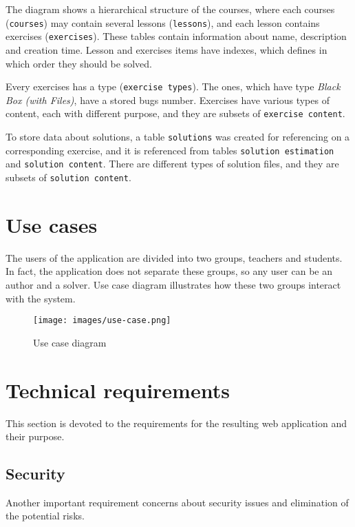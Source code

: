     The diagram shows a hierarchical structure of the courses, where each courses (\texttt{courses}) may contain several lessons (\texttt{lessons}), and each lesson contains exercises (\texttt{exercises}). These tables contain information about name, description and creation time. Lesson and exercises items have indexes, which defines in which order they should be solved.
    
    Every exercises has a type (\texttt{exercise types}). The ones, which have type \textit{Black Box (with Files)}, have a stored bugs number. Exercises have various types of content, each with different purpose, and they are subsets of \texttt{exercise content}.
    
    To store data about solutions, a table \texttt{solutions} was created for referencing on a corresponding exercise, and it is referenced from tables \texttt{solution estimation} and \texttt{solution content}. There are different types of solution files, and they are subsets of \texttt{solution content}.

    
    

    \section{Use cases}
    The users of the application are divided into two groups, teachers and students. In fact, the application does not separate these groups, so any user can be an author and a solver. Use case diagram illustrates how these two groups interact with the system.
    
    \begin{figure}[h]
    \centerline{
        \texttt{[image: images/use-case.png]}}
    \caption{Use case diagram}
    \label{fig:use-case}
    \end{figure}

    \section{Technical requirements}
    \label{sec:tech-requirements}
    This section is devoted to the requirements for the resulting web application and their purpose.
        
        \subsection{Security}
        \label{subsec:security}
        Another important requirement concerns about security issues and elimination of the potential risks.
        
